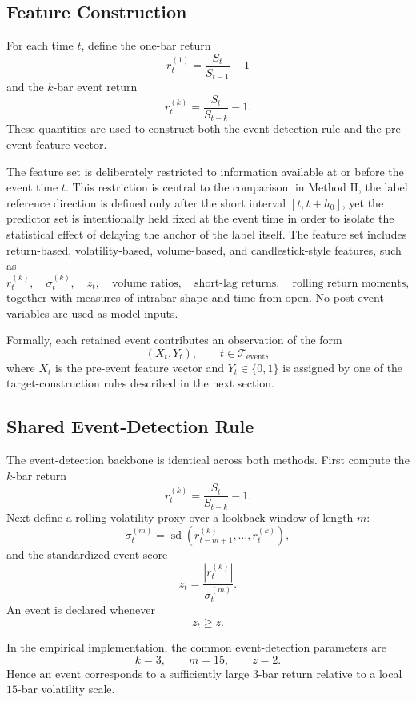 \documentclass[11pt,a4paper]{article}
\begin{document}
	\subsection{Feature Construction}

	For each time \(t\), define the one-bar return
	\[
	r_t^{(1)} = \frac{S_t}{S_{t-1}} - 1
	\]
	and the \(k\)-bar event return
	\[
	r_t^{(k)} = \frac{S_t}{S_{t-k}} - 1.
	\]
	These quantities are used to construct both the event-detection rule and the pre-event feature vector.

	The feature set is deliberately restricted to information available at or before the event time \(t\). This restriction is central to the comparison: in Method II, the label reference direction is defined only after the short interval \([t,t+h_0]\), yet the predictor set is intentionally held fixed at the event time in order to isolate the statistical effect of delaying the anchor of the label itself. The feature set includes return-based, volatility-based, volume-based, and candlestick-style features, such as
	\[
	r_t^{(k)},\quad \sigma_t^{(k)},\quad z_t,\quad \text{volume ratios},\quad \text{short-lag returns},\quad \text{rolling return moments},
	\]
	together with measures of intrabar shape and time-from-open. No post-event variables are used as model inputs.

	Formally, each retained event contributes an observation of the form
	\[
	(X_t,Y_t),\qquad t \in \mathcal{T}_{\mathrm{event}},
	\]
	where \(X_t\) is the pre-event feature vector and \(Y_t \in \{0,1\}\) is assigned by one of the target-construction rules described in the next section.

	\subsection{Shared Event-Detection Rule}

	The event-detection backbone is identical across both methods. First compute the \(k\)-bar return
	\[
	r_t^{(k)} = \frac{S_t}{S_{t-k}} - 1.
	\]
	Next define a rolling volatility proxy over a lookback window of length \(m\):
	\[
	\sigma_t^{(m)} = \operatorname{sd}\!\left(r_{t-m+1}^{(k)},\dots,r_t^{(k)}\right),
	\]
	and the standardized event score
	\[
	z_t = \frac{|r_t^{(k)}|}{\sigma_t^{(m)}}.
	\]
	An event is declared whenever
	\[
	z_t \ge z.
	\]

	In the empirical implementation, the common event-detection parameters are
	\[
	k=3,\qquad m=15,\qquad z=2.
	\]
	Hence an event corresponds to a sufficiently large \(3\)-bar return relative to a local \(15\)-bar volatility scale.
\end{document}
